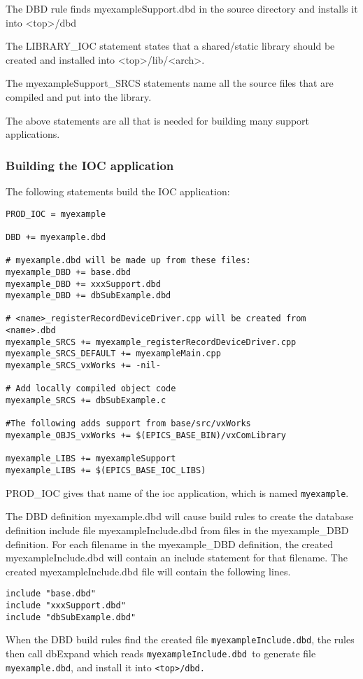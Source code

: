 The DBD rule finds myexampleSupport.dbd in the source directory and installs it into \textless{}top\textgreater{}/dbd

The LIBRARY\_IOC statement states that a shared/static library should be created and installed into \textless{}top\textgreater{}/lib/\textless{}arch\textgreater{}.

The myexampleSupport\_SRCS statements name all the source files that are compiled and put into the library.

The above statements are all that is needed for building many support applications.

\subsubsection{Building the IOC application}

The following statements build the IOC application:

\begin{verbatim}PROD_IOC = myexample

DBD += myexample.dbd

# myexample.dbd will be made up from these files:
myexample_DBD += base.dbd
myexample_DBD += xxxSupport.dbd
myexample_DBD += dbSubExample.dbd

# <name>_registerRecordDeviceDriver.cpp will be created from <name>.dbd
myexample_SRCS += myexample_registerRecordDeviceDriver.cpp
myexample_SRCS_DEFAULT += myexampleMain.cpp
myexample_SRCS_vxWorks += -nil-

# Add locally compiled object code
myexample_SRCS += dbSubExample.c

#The following adds support from base/src/vxWorks
myexample_OBJS_vxWorks += $(EPICS_BASE_BIN)/vxComLibrary

myexample_LIBS += myexampleSupport
myexample_LIBS += $(EPICS_BASE_IOC_LIBS)
\end{verbatim}PROD\_IOC gives that name of the ioc application, which is named \verb|myexample|. 

The DBD definition myexample.dbd will cause build rules to create the database definition include file 
myexampleInclude.dbd from files in the myexample\_DBD definition. For each filename in the myexample\_DBD 
definition, the created myexampleInclude.dbd will contain an include statement for that filename. The created 
myexampleInclude.dbd file will contain the following lines.

\begin{verbatim}include "base.dbd"
include "xxxSupport.dbd"
include "dbSubExample.dbd"
\end{verbatim}When the DBD build rules find the created file \verb|myexampleInclude.dbd|, the rules then call dbExpand which reads 
\verb|myexampleInclude.dbd |to generate file \verb|myexample.dbd|, and install it into \verb|<top>/dbd.|


